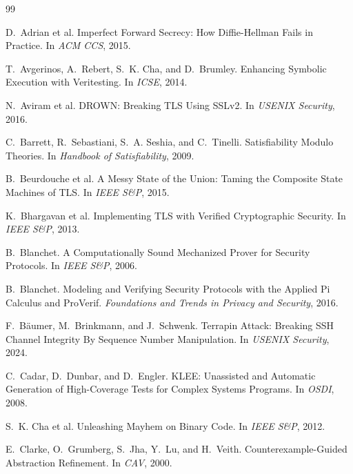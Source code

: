 \documentclass[10pt,twocolumn]{article}
\begin{document}

\begin{thebibliography}{99}

D.~Adrian et al.
\newblock Imperfect Forward Secrecy: How Diffie-Hellman Fails in Practice.
\newblock In \emph{ACM CCS}, 2015.

T.~Avgerinos, A.~Rebert, S.~K. Cha, and D.~Brumley.
\newblock Enhancing Symbolic Execution with Veritesting.
\newblock In \emph{ICSE}, 2014.

N.~Aviram et al.
\newblock DROWN: Breaking TLS Using SSLv2.
\newblock In \emph{USENIX Security}, 2016.

C.~Barrett, R.~Sebastiani, S.~A. Seshia, and C.~Tinelli.
\newblock Satisfiability Modulo Theories.
\newblock In \emph{Handbook of Satisfiability}, 2009.

B.~Beurdouche et al.
\newblock A Messy State of the Union: Taming the Composite State Machines of TLS.
\newblock In \emph{IEEE S\&P}, 2015.

K.~Bhargavan et al.
\newblock Implementing TLS with Verified Cryptographic Security.
\newblock In \emph{IEEE S\&P}, 2013.

B.~Blanchet.
\newblock A Computationally Sound Mechanized Prover for Security Protocols.
\newblock In \emph{IEEE S\&P}, 2006.

B.~Blanchet.
\newblock Modeling and Verifying Security Protocols with the Applied Pi Calculus and ProVerif.
\newblock \emph{Foundations and Trends in Privacy and Security}, 2016.

F.~B\"aumer, M.~Brinkmann, and J.~Schwenk.
\newblock Terrapin Attack: Breaking SSH Channel Integrity By Sequence Number Manipulation.
\newblock In \emph{USENIX Security}, 2024.

C.~Cadar, D.~Dunbar, and D.~Engler.
\newblock KLEE: Unassisted and Automatic Generation of High-Coverage Tests for Complex Systems Programs.
\newblock In \emph{OSDI}, 2008.

S.~K. Cha et al.
\newblock Unleashing Mayhem on Binary Code.
\newblock In \emph{IEEE S\&P}, 2012.

E.~Clarke, O.~Grumberg, S.~Jha, Y.~Lu, and H.~Veith.
\newblock Counterexample-Guided Abstraction Refinement.
\newblock In \emph{CAV}, 2000.


\end{thebibliography}
\end{document}
